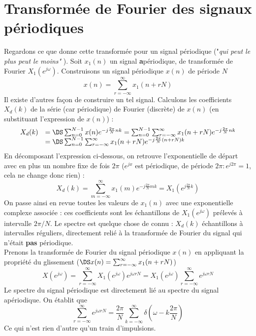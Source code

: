 \section{Transformée de Fourier des signaux périodiques}
Regardons ce que donne cette transformée pour un signal périodique ("\textit{qui peut le plus peut 
le moins" }). Soit $x_1(n)$ un signal \textbf{a}périodique, de transformée de Fourier $X_1(e^{j\omega})$.
Construisons un signal périodique $x(n)$ de période $N$ 
\begin{equation}
x(n) = \sum_{r=-\infty}^{\infty} x_1(n+rN)
\end{equation}
Il existe d'autres façon de construire un tel signal. Calculons les coefficients $X_d(k)$ de la 
série (car périodique) de Fourier (discrète) de $x(n)$ (en substituant l'expression de $x(n)$) :
\begin{equation}
\begin{array}{ll}
X_d(k) &=\DS \sum_{n=0}^{N-1} x(n) e^{-j\frac{2\pi}{N}nk} = \sum_{n=0}^{N-1}\sum_{r=-\infty}^{\infty} x_1(n+rN)
 e^{-j\frac{2\pi}{N}nk}\\
 &=\DS \sum_{n=0}^{N-1}\sum_{r=-\infty}^{\infty} x_1(n+rN) e^{-j\frac{2\pi}{N}(n+rN)k}
 \end{array}
\end{equation}
En décomposant l'expression ci-dessous, on retrouve l'exponentielle de départ avec en plus un
nombre fixe de fois $2\pi$ ($e^{jx}$ est périodique, de période $2\pi : e^{j2\pi}=1$, cela ne 
change donc rien) :
\begin{equation}
X_d(k) = \sum_{m=-\infty}^\infty x_1(m)e^{-j\frac{2\pi}{N}mk} = X_1(e^{j\frac{2\pi}{N}k})
\end{equation}
On passe ainsi en revue toutes les valeurs de $x_1(n)$ avec une exponentielle complexe associée : 
ces coefficients sont les échantillons de $X_1(e^{j\omega})$ prélevés à intervalle $2\pi/N$. Le 
spectre est quelque chose de connu : $X_d(k)$ échantillons à intervalles réguliers, directement 
relié à la transformée de Fourier du signal qui n'était \textbf{pas} périodique.\\

Prenons la transformée de Fourier du signal périodique $x(n)$ en appliquant la propriété du 
glissement ($\DS x(n) = \sum_{r=-\infty}^\infty x_1(n+rN)$)
\begin{equation}
X(e^{j\omega}) = \sum_{r=-\infty}^\infty X_1(e^{j\omega})e^{j\omega rN} = X_1(e^{j\omega})\sum_{
r=-\infty}^\infty e^{j\omega rN}
\end{equation}
Le spectre du signal périodique est directement lié au spectre du signal apériodique. On établit que
\begin{equation}
\sum_{r=-\infty}^\infty e^{j\omega rN} = \dfrac{2\pi}{N}\sum_{k=-\infty}^\infty \delta\left(
\omega-k\dfrac{2\pi}{N}\right)
\end{equation}
Ce qui n'est rien d'autre qu'un train d'impulsions.\\

